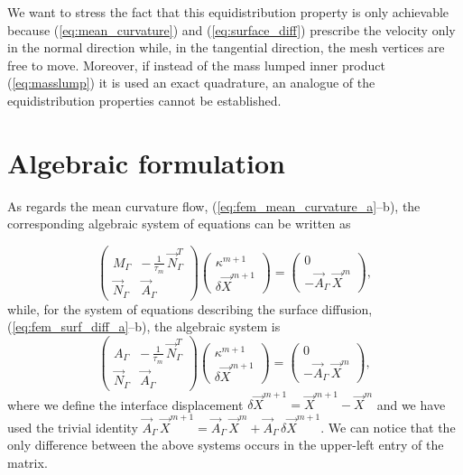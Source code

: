 We want to stress the fact that this equidistribution property is only
achievable because (\ref{eq:mean_curvature}) and (\ref{eq:surface_diff})
prescribe the velocity only in the normal direction while, in the tangential
direction, the mesh vertices are free to move. Moreover, if instead of the mass
lumped inner product (\ref{eq:masslump}) it is used an exact quadrature, an
analogue of the equidistribution properties cannot be established.

\section{Algebraic formulation}\label{sec:geometric_pdes_algebraic}
As regards the mean curvature flow, (\ref{eq:fem_mean_curvature_a}--b), the
corresponding algebraic system of equations can be written as

\begin{equation}\label{eq:algebraic_mean_curvature}
\begin{pmatrix}
M_\Gamma & -\,\frac{1}{\tau_m} \, \vec N_\Gamma^T \\
\vec N_\Gamma & \vec A_\Gamma
\end{pmatrix}
\begin{pmatrix}
\kappa^{m + 1} \\
\delta \vec X^{m + 1}
\end{pmatrix}
=
\begin{pmatrix}
0 \\
- \vec A_\Gamma \, \vec X^m
\end{pmatrix} ,
\end{equation}
while, for the system of equations describing the surface diffusion,
(\ref{eq:fem_surf_diff_a}--b), the algebraic system is
\begin{equation}\label{eq:algebraic_surf_diff}
\begin{pmatrix}
A_\Gamma & - \,\frac{1}{\tau_m}\, \vec N_\Gamma^T \\
\vec N_\Gamma & \vec A_\Gamma
\end{pmatrix}
\begin{pmatrix}
\kappa^{m + 1} \\
\delta \vec X^{m + 1}
\end{pmatrix}
=
\begin{pmatrix}
0 \\
- \vec A_\Gamma \, \vec X^m
\end{pmatrix},
\end{equation}
where we define the interface displacement $\delta \vec X^{m + 1}=\vec X^{m +
1} - \vec X^m$ and we have used the trivial identity $\vec A_\Gamma\,\vec
X^{m+1} = \vec A_\Gamma\,\vec X^m + \vec A_\Gamma\,\delta \vec X^{m+1}$. We can
notice that the only difference between the above systems occurs in the
upper-left entry of the matrix.

